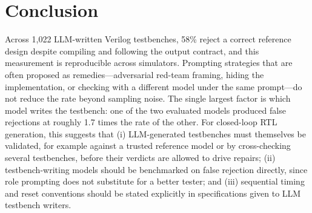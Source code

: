 \documentclass[conference]{IEEEtran}
\begin{document}
\section{Conclusion}
Across 1,022 LLM-written Verilog testbenches, 58\% reject a correct reference design despite compiling and following the output contract, and this measurement is reproducible across simulators. Prompting strategies that are often proposed as remedies---adversarial red-team framing, hiding the implementation, or checking with a different model under the same prompt---do not reduce the rate beyond sampling noise. The single largest factor is which model writes the testbench: one of the two evaluated models produced false rejections at roughly 1.7 times the rate of the other. For closed-loop RTL generation, this suggests that (i) LLM-generated testbenches must themselves be validated, for example against a trusted reference model or by cross-checking several testbenches, before their verdicts are allowed to drive repairs; (ii) testbench-writing models should be benchmarked on false rejection directly, since role prompting does not substitute for a better tester; and (iii) sequential timing and reset conventions should be stated explicitly in specifications given to LLM testbench writers.



\end{document}
